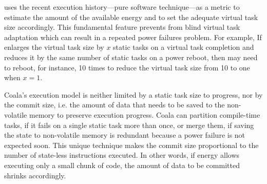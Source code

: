 \sys uses the recent execution history---pure software technique---as a metric to estimate the amount of the available energy and to set the adequate virtual task size accordingly. This fundamental feature prevents \sys from blind virtual task adaptation which can result in a repeated power failures problem. For example, If \sys enlarges the virtual task size by $x$ static tasks on a virtual task completion and reduces it by the same number of static tasks on a power reboot, then \sys may need to reboot, for instance, 10 times to reduce the virtual task size from 10 to one when $x=1$. 


Coala's execution model is neither limited by a static task size to progress, nor by the commit size, i.e. the amount of data that needs to be saved to the non-volatile memory to preserve execution progress. Coala can partition compile-time tasks, if it fails on a single static task more than once, or merge them, if saving the state to non-volatile memory is redundant because a power failure is not expected soon. This unique technique makes the commit size proportional to the number of state-less instructions executed. In other words, if energy allows executing only a small chunk of code, the amount of data to be committed shrinks accordingly.





